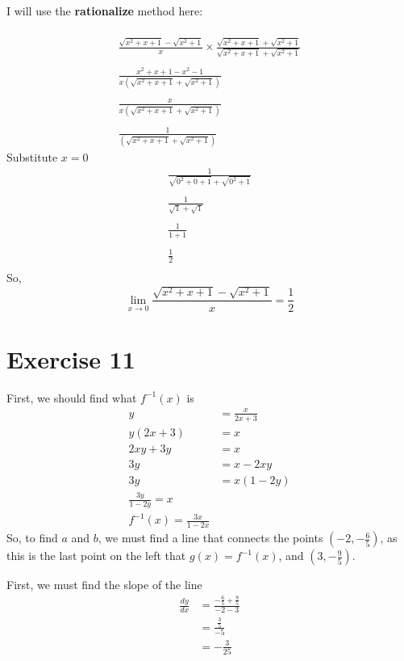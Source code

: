 \documentclass[11pt]{article}
\begin{document}
\begin{enumerate}
        I will use the \textbf{rationalize} method here:


\begin{gather*}
  \\
  \frac{\sqrt{x^{2}+x+1}-\sqrt{x^{2}+1}}{x} \times \frac{{\sqrt{x^{2}+x+1}+\sqrt{x^{2}+1}}}{\sqrt{x^{2}+x+1}+\sqrt{x^{2}+1}} \\
  \\
  \frac{x^{2}+x+1-x^{2}-1}{x\left(\sqrt{x^{2}+x+1}+\sqrt{x^{2}+1}\right)} \\
  \\
  \frac{x}{x\left(\sqrt{x^{2}+x+1}+\sqrt{x^{2}+1}\right)} \\
  \\
  \frac{1}{\left(\sqrt{x^{2}+x+1}+\sqrt{x^{2}+1}\right)}
\end{gather*}
        Substitute \(x = 0\)
\begin{gather*}
  \frac{1}{\sqrt{0^{2}+0+1}+\sqrt{0^{2}+1}} \\
  \\
  \frac{1}{\sqrt{1}+\sqrt{1}} \\
  \\
  \frac{1}{1+1}\\
  \\
  \frac{1}{2} \\
\end{gather*}
        So,
        \[
  \lim_{x \rightarrow 0} \frac{\sqrt{x^{2}+x+1}-\sqrt{x^{2}+1}}{x} = \frac{1}{2}
        \]
\end{enumerate}
\section*{Exercise 11}
First, we should find what $f^{-1}(x)$ is
\begin{align*}
  y &= \frac{x}{2x+3} \\
  y(2x+3) &= x \\
  2xy +3y &= x \\
  3y &= x-2xy \\
  3y &= x(1-2y) \\
  \frac{3y}{1-2y} = x \\
  f^{-1}(x) = \frac{3x}{1-2x}
\end{align*}
So, to find $a$ and $b$,  we must find a line that connects the points $(-2,-\frac{6}{5})$, as this is the last point on the left that $g(x) = f^{-1}(x)$, and $(3,-\frac{9}{5})$.

First, we must find the slope of the line
\begin{align*}
\frac{dy}{dx} &= \frac{-\frac{6}{5}+\frac{9}{5}}{-2-3} \\
              &= \frac{\frac{3}{5}}{-5} \\
  &= - \frac{3}{25}
\end{align*}
\end{document}

